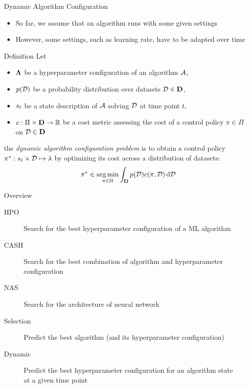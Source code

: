 \begin{frame}[c]{Dynamic Algorithm Configuration}

\begin{itemize}
	\item So far, we assume that an algorithm runs with some given settings
	\pause
	\item However, some settings, such as learning rate, have to be adapted over time
\end{itemize}

\pause

\begin{block}{Definition}
	Let 
	\begin{itemize}
		\item $\mathbf{\Lambda}$ be a hyperparameter configuration of an algorithm $\mathcal{A}$,
		\pause
		\item $p(\mathcal{D})$ be a probability distribution over datasets $\mathcal{D} \in \mathbf{D}$,
		\pause
		\item $s_t$ be a state description of $\mathcal{A}$ solving $\mathcal{D}$ at time point $t$,
		\pause
		\item $c: \Pi \times \mathbf{D} \to \mathbb{R}$ be a cost metric assessing the \alert{cost of a control policy $\pi \in \Pi$} on $\mathcal{D} \in \mathbf{D}$
	\end{itemize}
	
	\pause
	the \emph{dynamic algorithm configuration problem} is to obtain a control policy $\pi^* : s_t \times \mathcal{D} \mapsto \mathbf{\lambda}$ by optimizing its cost across a distribution of datasets:
	\begin{equation}
	\pi^* \in \operatorname*{arg\,min}_{\pi \in \Pi} \int_{\mathbf{D}} p(\mathcal{D}) c(\pi, \mathcal{D}) \mathop{}\!\mathrm{d} \mathcal{D} \nonumber
	\end{equation}
\end{block}

\end{frame}
\begin{frame}[c]{Overview}

\begin{description}
	\item[HPO] Search for the best hyperparameter configuration of a ML algorithm
	\item[CASH] Search for the best combination of algorithm and hyperparameter configuration
	\item[NAS] Search for the architecture of neural network
	\item[Selection] Predict the best algorithm (and its hyperparameter configuration)
	\item[Dynamic] Predict the best hyperparameter configuration for an algorithm state\\ at a given time point 
\end{description}

\end{frame}

